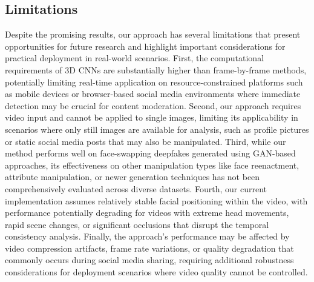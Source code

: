 \documentclass[conference]{IEEEtran}
\begin{document}
\subsection{Limitations}
Despite the promising results, our approach has several limitations that present opportunities for future research and highlight important considerations for practical deployment in real-world scenarios.
First, the computational requirements of 3D CNNs are substantially higher than frame-by-frame methods, potentially limiting real-time application on resource-constrained platforms such as mobile devices or browser-based social media environments where immediate detection may be crucial for content moderation.
Second, our approach requires video input and cannot be applied to single images, limiting its applicability in scenarios where only still images are available for analysis, such as profile pictures or static social media posts that may also be manipulated.
Third, while our method performs well on face-swapping deepfakes generated using GAN-based approaches, its effectiveness on other manipulation types like face reenactment, attribute manipulation, or newer generation techniques has not been comprehensively evaluated across diverse datasets.
Fourth, our current implementation assumes relatively stable facial positioning within the video, with performance potentially degrading for videos with extreme head movements, rapid scene changes, or significant occlusions that disrupt the temporal consistency analysis.
Finally, the approach's performance may be affected by video compression artifacts, frame rate variations, or quality degradation that commonly occurs during social media sharing, requiring additional robustness considerations for deployment scenarios where video quality cannot be controlled.
\end{document}
